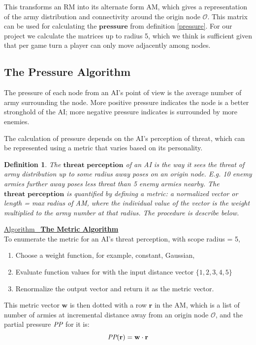 \documentclass[12pt]{article}  %
\newtheorem{definition}{Definition}
\newcommand{\algtitle}[1]{\underline{Algorithm \ {\bf #1}} \vspace*{1mm}\\}
\begin{document}
This transforms an RM into its alternate form AM, which gives a representation of the army distribution and connectivity around the origin node $\mathcal{O}$. This matrix can be used for calculating the $\textbf{pressure}$ from definition \ref{pressure}. For our project we calculate the matrices up to radius 5, which we think is sufficient given that per game turn a player can only move adjacently among nodes.





\subsection{The Pressure Algorithm}

The pressure of each node from an AI's point of view is the average number of army surrounding the node. More positive pressure indicates the node is a better stronghold of the AI; more negative pressure indicates is surrounded by more enemies.

The calculation of pressure depends on the AI's perception of threat, which can be represented using a metric that varies based on its personality.

\begin{definition}
The $\textbf{threat perception}$ of an AI is the way it sees the threat of army distribution up to some radius away poses on an origin node. E.g. 10 enemy armies further away poses less threat than 5 enemy armies nearby. The $\textbf{threat perception}$ is quantified by defining a metric: a normalized vector or length = max radius of AM, where the individual value of the vector is the weight multiplied to the army number at that radius. The procedure is describe below.
\end{definition}

\algtitle{The Metric Algorithm}
To enumerate the metric for an AI's threat perception, with scope radius = 5,
\begin{enumerate}
	\item Choose a weight function, for example, constant, Gaussian,
	\item Evaluate function values for with the input distance vector $\{1,2,3,4,5\}$
	\item Renormalize the output vector and return it as the metric vector.
\end{enumerate}

This metric vector $\mathbf{w}$ is then dotted with a row $\mathbf{r}$ in the AM, which is a list of number of armies at incremental distance away from an origin node $\mathcal{O}$, and the partial pressure $\emph{PP}$ for it is:
$$\emph{PP}(\mathbf{r}) = \mathbf{w} \cdot \mathbf{r}$$
\end{document}
